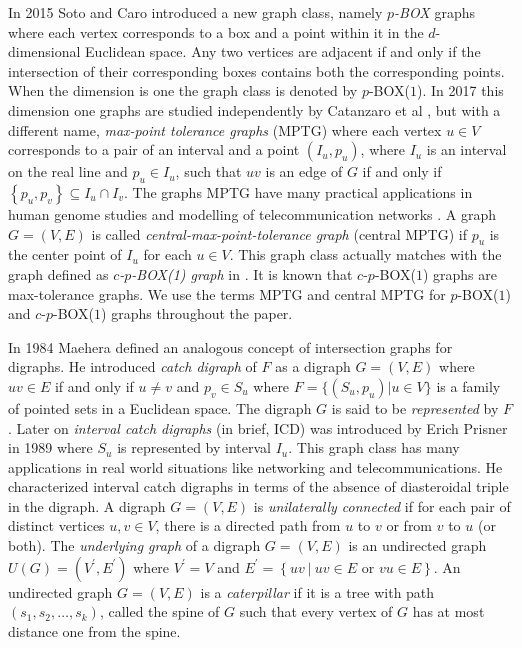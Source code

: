 \documentclass{article}
\theoremstyle{definition}
\numberwithin{equation}{section}
\newcommand{\set}[1]{\left\{#1\right\}}
\newcommand{\Set}[2]{\set{#1\ \vert\ #2}}
\begin{document}
\vspace{0.3em}
\noindent In 2015 Soto and Caro \cite{Soto} introduced a new graph class, namely {\em $p$-BOX} graphs where each vertex corresponds to a box and a point within it in the $d$-dimensional Euclidean space.  Any two vertices are adjacent if and only if the intersection of their corresponding boxes contains both the corresponding points. When the dimension is one the graph class is denoted by $p$-BOX($1$). In 2017 this dimension one graphs are studied independently by Catanzaro et al \cite{Catanzaro}, but with a different name, {\em max-point tolerance graphs} (MPTG) where each vertex $u\in V$ corresponds to a pair of an interval and a point $(I_u,p_u)$, where $I_u$ is an interval on the real line and $p_u\in I_u$, such that $uv$ is an edge of $G$ if and only if $\set{p_u,p_v}\subseteq I_u\cap I_v$. The graphs MPTG have many practical applications in human genome studies and modelling of telecommunication networks \cite{Catanzaro}. A graph $G=(V,E)$ is called {\em central-max-point-tolerance graph} (central MPTG) if $p_u$ is the center point of $I_u$ for each $u\in V$. This graph class actually matches with the graph defined as \textit{$c$-$p$-BOX(1) graph} in \cite{Soto}. It is known that $c$-$p$-BOX($1$) graphs are max-tolerance graphs. We use the terms MPTG and central MPTG for $p$-BOX($1$) and $c$-$p$-BOX($1$) graphs throughout the paper.

\vspace{0.3em}
\noindent In 1984 \cite{Maehera} Maehera defined an analogous concept of intersection graphs for digraphs. He introduced {\em catch digraph} of $F$ as a digraph $G=(V,E)$ where $uv\in E$ if and only if $u\neq v$ and $p_{v}\in S_{u}$ where $F=\{(S_{u},p_{u})|u\in V\}$ is a family of pointed sets in a Euclidean space. The digraph $G$ is said to be {\em represented} by $F$. Later on {\em interval catch digraphs} (in brief, ICD) was introduced by Erich Prisner in 1989 \cite{Prisner} where $S_{u}$ is represented by interval $I_{u}$. This graph class has many applications in real world situations like networking and telecommunications. He characterized interval catch digraphs in terms of the absence of diasteroidal triple in the digraph. A digraph $G=(V,E)$ is {\em unilaterally connected} if for each pair of distinct vertices $u,v\in V$, there is a directed path from $u$ to $v$ or from $v$ to $u$ (or both). The {\em underlying graph} of a digraph $G=(V,E)$ is an undirected graph $U(G)=(V^\prime ,E^\prime )$ where $V^\prime =V$ and $E^\prime =\Set{uv}{uv\in E\text{ or }vu\in E}$. An undirected graph $G=(V,E)$ is a {\em caterpillar} if it is a tree with path $(s_{1},s_{2},\hdots,s_{k})$, called the spine of $G$ such that every vertex of $G$ has at most distance one from the spine.
\end{document}
